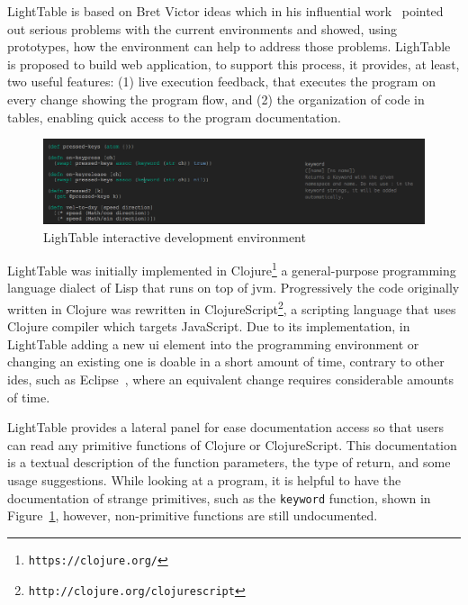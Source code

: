 LightTable is based on Bret Victor ideas which in his influential work~\citep{inventingPrin,learnableProg} pointed out serious problems with the current environments and showed, using prototypes, how the environment can help to address those problems. LighTable is proposed to build web application, to support this process, it provides, at least, two useful features: (1) live execution feedback, that executes the program on every change showing the program flow, and (2) the organization of code in tables, enabling quick access to the program documentation.

\begin{figure}[!htbp]
  \centering
  \includegraphics[width=1.0\textwidth]{images/lt2}
    \caption{LighTable interactive development environment}
  \label{fig:lt}
\end{figure} 

LightTable was initially implemented in Clojure\footnote{\texttt{https://clojure.org/}} a general-purpose programming language dialect of Lisp that runs on top of \gls{jvm}. Progressively the code originally written in Clojure was rewritten in ClojureScript\footnote{\texttt{http://clojure.org/clojurescript}}, a scripting language that uses Clojure compiler which targets JavaScript. Due to its implementation, in LightTable adding a new \gls{ui} element into the programming environment or changing an existing one is doable in a short amount of time, contrary to other \glspl{ide}, such as Eclipse~\citep{carlson2005eclipse}, where an equivalent change requires considerable amounts of time. 

LightTable provides a lateral panel for ease documentation access so that users can read any primitive functions of Clojure or ClojureScript. This documentation is a textual description of the function parameters, the type of return, and some usage suggestions. While looking at a program, it is helpful to have the documentation of strange primitives, such as the \texttt{keyword} function, shown in Figure~\ref{fig:lt}, however, non-primitive functions are still undocumented. 

